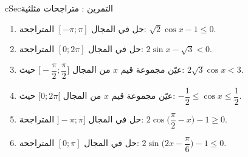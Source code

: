 \documentclass[12pt,a4paper]{article}
\newenvironment{BOX}[2]{\begin{otherlanguage}{english}\begin{arbox}{#1}{#2}}{\end{arbox}\end{otherlanguage}}
\newcounter{exo}
\newenvironment{tamrin}[1]{\stepcounter{exo}\begin{BOX}{cSec}{التمرين \theexo: #1}}{\end{BOX}}
\begin{document}
\begin{tamrin}{متراجحات مثلثية}
\begin{enumerate}
\item حل في المجال $[-\pi;\pi]$ المتراجحة: $\sqrt2\cos x-1\le0$.
\item حل في المجال $[0;2\pi]$ المتراجحة: $2\sin x-\sqrt3<0$.
\item عيّن مجموعة قيم $x$ من المجال $\Big[-\dfrac{\pi}{2};\dfrac{\pi}{2}\Big]$ حيث: $2\sqrt3\cos x<3$.
\item عيّن مجموعة قيم $x$ من المجال $[0;2\pi[$ حيث: $-\dfrac12\le\cos x\le\dfrac12$.
\item حل في المجال $]-\pi;\pi]$ المتراجحة: $2\cos\Big(\dfrac{\pi}{2}-x\Big)-1\ge0$.
\item حل في المجال $[0;\pi]$ المتراجحة: $2\sin\Big(2x-\dfrac{\pi}{6}\Big)-1\le0$.
\end{enumerate}
\end{tamrin}
\end{document}

